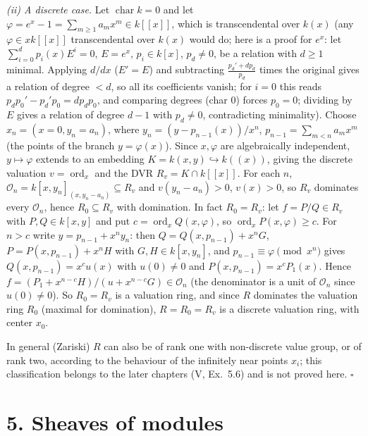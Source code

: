 \documentclass[11pt]{article}
\begin{document}
\emph{(ii) A discrete case.} Let $\operatorname{char}k=0$ and let $\varphi=e^x-1=\sum_{m\ge1}a_mx^m\in k[[x]]$, which is transcendental over $k(x)$ (any $\varphi\in xk[[x]]$ transcendental over $k(x)$ would do; here is a proof for $e^x$: let $\sum_{i=0}^dp_i(x)E^i=0$, $E=e^x$, $p_i\in k[x]$, $p_d\neq0$, be a relation with $d\ge1$ minimal. Applying $d/dx$ ($E'=E$) and subtracting $\tfrac{p_d'+dp_d}{p_d}$ times the original gives a relation of degree $<d$, so all its coefficients vanish; for $i=0$ this reads $p_dp_0'-p_d'p_0=dp_dp_0$, and comparing degrees (char $0$) forces $p_0=0$; dividing by $E$ gives a relation of degree $d-1$ with $p_d\neq0$, contradicting minimality). Choose $x_n=(x=0,y_n=a_n)$, where $y_n=(y-p_{n-1}(x))/x^n$, $p_{n-1}=\sum_{m<n}a_mx^m$ (the points of the branch $y=\varphi(x)$). Since $x,\varphi$ are algebraically independent, $y\mapsto\varphi$ extends to an embedding $K=k(x,y)\hookrightarrow k((x))$, giving the discrete valuation $v=\operatorname{ord}_x$ and the DVR $R_v=K\cap k[[x]]$. For each $n$, $\mathcal O_n=k[x,y_n]_{(x,y_n-a_n)}\subseteq R_v$ and $v(y_n-a_n)>0$, $v(x)>0$, so $R_v$ dominates every $\mathcal O_n$, hence $R_0\subseteq R_v$ with domination. In fact $R_0=R_v$: let $f=P/Q\in R_v$ with $P,Q\in k[x,y]$ and put $c=\operatorname{ord}_xQ(x,\varphi)$, so $\operatorname{ord}_xP(x,\varphi)\ge c$. For $n>c$ write $y=p_{n-1}+x^ny_n$: then $Q=Q(x,p_{n-1})+x^nG$, $P=P(x,p_{n-1})+x^nH$ with $G,H\in k[x,y_n]$, and $p_{n-1}\equiv\varphi\pmod{x^n}$ gives $Q(x,p_{n-1})=x^cu(x)$ with $u(0)\neq0$ and $P(x,p_{n-1})=x^cP_1(x)$. Hence $f=(P_1+x^{n-c}H)/(u+x^{n-c}G)\in\mathcal O_n$ (the denominator is a unit of $\mathcal O_n$ since $u(0)\neq0$). So $R_0=R_v$ is a valuation ring, and since $R$ dominates the valuation ring $R_0$ (maximal for domination), $R=R_0=R_v$ is a discrete valuation ring, with center $x_0$.

In general (Zariski) $R$ can also be of rank one with non-discrete value group, or of rank two, according to the behaviour of the infinitely near points $x_i$; this classification belongs to the later chapters (V, Ex.~5.6) and is not proved here. \hfill$\square$

\section*{5. Sheaves of modules}
\end{document}
